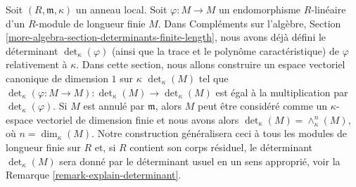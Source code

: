 \medskip\noindent
Soit $(R, \mathfrak m, \kappa)$ un anneau local. Soit
$\varphi : M \to M$ un endomorphisme $R$-linéaire d'un
$R$-module de longueur finie $M$. Dans Compléments sur l'algèbre, Section
\ref{more-algebra-section-determinants-finite-length},
nous avons déjà défini le déterminant $\det_\kappa(\varphi)$
(ainsi que la trace et le polynôme caractéristique)
de $\varphi$ relativement à $\kappa$. Dans cette section, nous allons
construire un espace vectoriel canonique de dimension $1$ sur $\kappa$
$\det_\kappa(M)$ tel que
$\det_\kappa(\varphi : M \to M) : \det_\kappa(M) \to \det_\kappa(M)$
est égal à la multiplication par $\det_\kappa(\varphi)$.
Si $M$ est annulé par $\mathfrak m$, alors $M$ peut être considéré
comme un $\kappa$-espace vectoriel de dimension finie et nous avons alors
$\det_\kappa(M) = \wedge^n_\kappa(M)$, où $n = \dim_\kappa(M)$.
Notre construction généralisera ceci à tous les modules de longueur finie
sur $R$ et, si $R$ contient son corps résiduel, le déterminant
$\det_\kappa(M)$ sera donné par le déterminant usuel en un sens
approprié, voir la Remarque \ref{remark-explain-determinant}.

